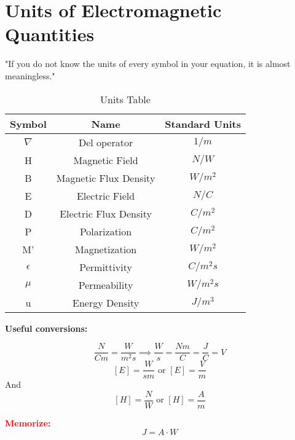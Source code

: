 
\section{Units of Electromagnetic Quantities}
"If you do not know the units of every symbol in your equation, it is almost meaningless."

\begin{table}[!hbtp]
    \centering
    \caption{Units Table}
    \begin{tabular}{c | c | c}
        \toprule
        Symbol     & Name                  & Standard Units \\
        \toprule
        $\nabla$   & Del operator          & $1/m$          \\
        H          & Magnetic Field        & $N/W$          \\
        B          & Magnetic Flux Density & $W/m^2$        \\
        E          & Electric Field        & $N/C$          \\
        D          & Electric Flux Density & $C/m^2$        \\
        P          & Polarization          & $C/m^2$        \\
        M'         & Magnetization         & $W/m^2$        \\
        $\epsilon$ & Permittivity          & $C/m^2s$      \\
        $\mu$      & Permeability          & $W/m^2s$      \\
        u          & Energy Density        & $J/m^3$       \\
        \bottomrule
    \end{tabular}
    \label{tab:units}
\end{table}

\textbf{Useful conversions:}

\[
\frac{N}{Cm} = \frac{W}{m^2s} \implies \frac{W}{s} = \frac{Nm}{C} = \frac{J}{C} = V
\]
\[
[E] = \frac{W}{sm} \text{  or  } [E] = \frac{V}{m}
\]
And
\[
[H] = \frac{N}{W} \text{  or  } [H] = \frac{A}{m}
\]

\textbf{\textcolor{red}{Memorize:}}
\[
J = A \cdot W
\]